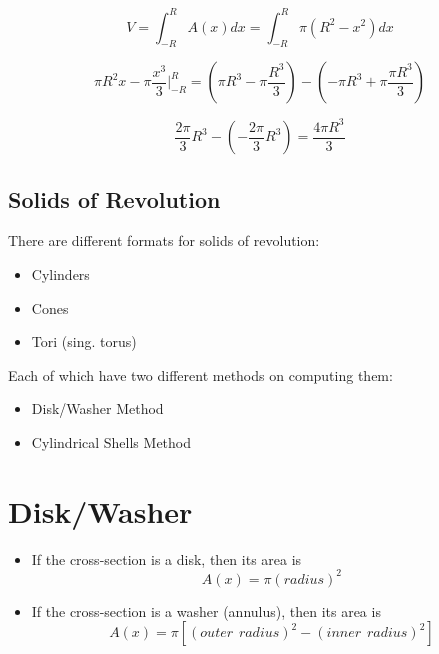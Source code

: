 \documentclass[12pt, letterpaper]{article}
\begin{document}
    \begin{equation*}
        V = \int_{-R}^{R} A(x) dx = \int_{-R}^{R} \pi (R^2 - x^2)dx
    \end{equation*}
    
    \begin{equation*}
        \pi R^2 x - \pi \frac{x^3}{3} \bigg| ^{R}_{-R} = \left(\pi R^3 - \pi \frac{R^3}{3}\right) - \left( -\pi R^3 + \pi \frac {\pi R^3}{3}\right)
    \end{equation*}
    
    \begin{equation*}
        \frac{2\pi}{3} R^3 - \left(- \frac{2\pi}{3}R^3\right) = \frac{4\pi R^3}{3}
    \end{equation*}
    
    \subsection*{Solids of Revolution}
    
    \begin{flushleft}
        There are different formats for solids of revolution:
        \begin{itemize}
            \item Cylinders
            \item Cones
            \item Tori (sing. torus)
        \end{itemize}
        Each of which have two different methods on computing them:
        \begin{itemize}
            \item Disk/Washer Method
            \item Cylindrical Shells Method
        \end{itemize}
    \end{flushleft}
    
    \section*{Disk/Washer}
        \begin{itemize}
            \item If the cross-section is a disk, then its area is
                \begin{equation}
                    A(x) = \pi(radius)^2
                \end{equation}
            \item If the cross-section is a washer (annulus), then its area is
                \begin{equation}
                    A(x) = \pi[(outer\hspace{5pt}radius)^2 - (inner\hspace{5pt}radius)^2]
                \end{equation}
        \end{itemize}
    
\end{document}
